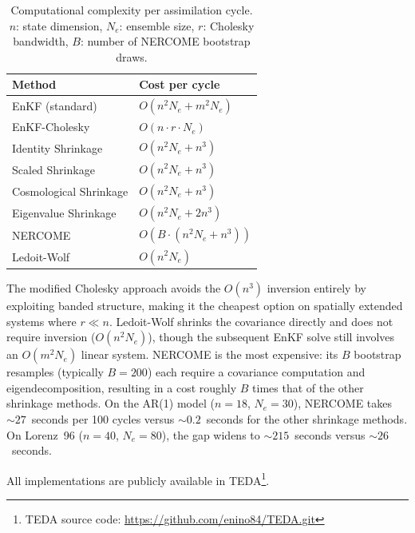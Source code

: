 \begin{table}[t]
\centering
\caption{Computational complexity per assimilation cycle. $n$: state dimension, $N_e$: ensemble size, $r$: Cholesky bandwidth, $B$: number of NERCOME bootstrap draws.}
\label{tab:complexity}
\begin{tabular}{@{}ll@{}}
\toprule
Method & Cost per cycle \\
\midrule
EnKF (standard)              & $O(n^2 N_e + m^2 N_e)$ \\
EnKF-Cholesky                & $O(n \cdot r \cdot N_e)$ \\
Identity Shrinkage           & $O(n^2 N_e + n^3)$ \\
Scaled Shrinkage             & $O(n^2 N_e + n^3)$ \\
Cosmological Shrinkage       & $O(n^2 N_e + n^3)$ \\
Eigenvalue Shrinkage         & $O(n^2 N_e + 2n^3)$ \\
NERCOME                      & $O(B \cdot (n^2 N_e + n^3))$ \\
Ledoit-Wolf                  & $O(n^2 N_e)$ \\
\bottomrule
\end{tabular}
\end{table}

The modified Cholesky approach avoids the $O(n^3)$ inversion entirely by exploiting banded structure, making it the cheapest option on spatially extended systems where $r \ll n$. Ledoit-Wolf shrinks the covariance directly and does not require inversion ($O(n^2 N_e)$), though the subsequent EnKF solve still involves an $O(m^2 N_e)$ linear system. NERCOME is the most expensive: its $B$ bootstrap resamples (typically $B = 200$) each require a covariance computation and eigendecomposition, resulting in a cost roughly $B$ times that of the other shrinkage methods. On the AR(1) model ($n = 18$, $N_e = 30$), NERCOME takes ${\sim}27$~seconds per 100 cycles versus ${\sim}0.2$~seconds for the other shrinkage methods. On Lorenz~96 ($n = 40$, $N_e = 80$), the gap widens to ${\sim}215$~seconds versus ${\sim}26$~seconds.

All implementations are publicly available in TEDA\footnote{TEDA source code: \url{https://github.com/enino84/TEDA.git}}.
